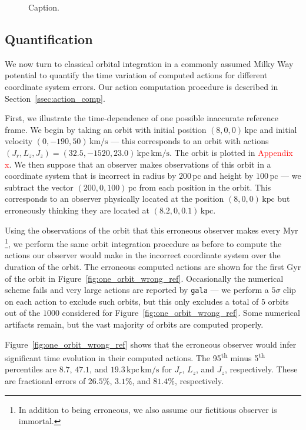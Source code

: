 \documentclass[twocolumn]{aastex62}
\newcommand{\Gus}[1]{\textcolor{red}{#1}}
\newcommand{\pc}{\text{pc}}
\newcommand{\kpc}{\text{kpc}}
\newcommand{\Myr}{\text{Myr}}
\newcommand{\Gyr}{\text{Gyr}}
\newcommand{\kms}{\text{km}/\text{s}}
\newcommand{\actunit}{\text{kpc}\,\kms}
\begin{document}
\begin{figure*}
\caption{Caption.}
\label{fig:cartoon}
\end{figure*}

\subsection{Quantification} \label{ssec:quant}
We now turn to classical orbital integration in a commonly assumed Milky Way
potential to quantify the time variation of computed actions for different
coordinate system errors. Our action computation procedure is described in
Section~\ref{ssec:action_comp}.

First, we illustrate the time-dependence of one possible inaccurate reference
frame. We begin by taking an orbit with initial position $(8, 0, 0)\,\kpc$ and
initial velocity $(0, -190, 50)\,\kms$ --- this corresponds to an orbit with
actions $(J_r, L_z, J_z) = (32.5, -1520, 23.0)\,\actunit$. The orbit is
plotted in \Gus{Appendix x}. We then suppose that an observer makes
observations of this orbit in a coordinate system that is incorrect in radius by
$200\,\pc$ and height by $100\,\pc$ --- we subtract the vector $(200, 0,
100)\,\pc$ from each position in the orbit. This corresponds to an observer
physically located at the position $(8, 0, 0)\,\kpc$ but erroneously thinking
they are located at $(8.2, 0, 0.1)\,\kpc$.

Using the observations of the orbit that this erroneous observer makes every
$\Myr$\footnote{In addition to being erroneous, we also assume our fictitious
observer is immortal.}, we perform the same orbit integration procedure as
before to compute the actions our observer would make in the incorrect
coordinate system over the duration of the orbit. The erroneous computed
actions are shown for the first $\Gyr$ of the orbit in
Figure~\ref{fig:one_orbit_wrong_ref}. Occasionally the numerical scheme fails
and very large actions are reported by \texttt{gala}
--- we perform a $5\sigma$ clip on each action to exclude such orbits, but
this only excludes a total of $5$ orbits out of the $1000$ considered for
Figure~\ref{fig:one_orbit_wrong_ref}. Some numerical artifacts remain, but the
vast majority of orbits are computed properly.

Figure~\ref{fig:one_orbit_wrong_ref} shows that the erroneous observer would
infer significant time evolution in their computed actions. The
95\textsuperscript{th} minus 5\textsuperscript{th} percentiles are $8.7$,
$47.1$, and $19.3\,\actunit$ for $J_r$, $L_z$, and $J_z$, respectively. These
are fractional errors of $26.5\%$, $3.1\%$, and $81.4\%$, respectively.
\end{document}
